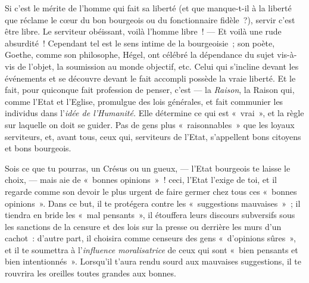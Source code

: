 \documentclass[french,twoside]{book} %
\begin{document}
Si c’est le mérite de l’homme qui fait sa liberté (et  que manque-t-il à la liberté que réclame le cœur du bon bourgeois ou du fonctionnaire fidèle ?), servir c’est être libre. Le serviteur obéissant, voilà l’homme libre ! — Et voilà une rude absurdité ! Cependant tel est le sens intime de la bourgeoisie ; son poète, Goethe, comme son philosophe, Hégel, ont célébré la dépendance du sujet vis-à-vis de l’objet, la soumission au monde objectif, etc. Celui qui s’incline devant les événements et se découvre devant le fait accompli possède la vraie liberté. Et le fait, pour quiconque fait profession de penser, c’est — la \emph{Raison}, la Raison qui, comme l’Etat et l’Eglise, promulgue des lois générales, et fait communier les individus dans l’\emph{idée de l’Humanité.} Elle détermine ce qui est « vrai », et la règle sur laquelle on doit se guider. Pas de gens plus « raisonnables » que les loyaux serviteurs, et, avant tous, ceux qui, serviteurs de l’Etat, s’appellent bons citoyens et bons bourgeois.\par
Sois ce que tu pourras, un Crésus ou un gueux, — l’Etat bourgeois te laisse le choix, — mais aie de « bonnes opinions » ! ceci, l’Etat l’exige de toi, et il regarde comme son devoir le plus urgent de faire germer chez tous ces « bonnes opinions ». Dans ce but, il te protégera contre les « suggestions mauvaises » ; il tiendra en bride les « mal pensants », il étouffera leurs discours subversifs sous les sanctions de la censure et des lois sur la presse ou derrière les murs d’un cachot : d’autre part, il choisira comme censeurs des gens « d’opinions sûres », et il te soumettra à l’\emph{influence moralisatrice} de ceux qui sont « bien pensants et bien intentionnés ». Lorsqu’il t’aura rendu sourd aux mauvaises suggestions, il te rouvrira les oreilles toutes grandes aux bonnes.\par
\end{document}
